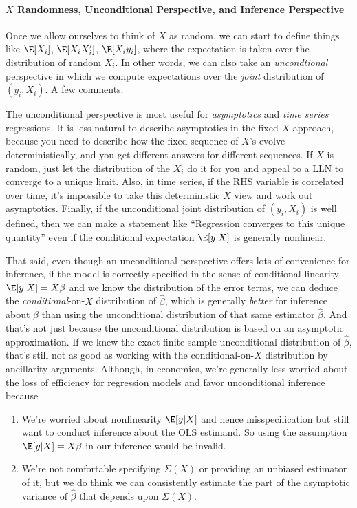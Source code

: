 \documentclass[12pt]{article}
\theoremstyle{plain}
\theoremstyle{definition}
\theoremstyle{remark}
\begin{document}
\paragraph{$X$ Randomness, Unconditional Perspective, and Inference Perspective}
Once we allow ourselves to think of $X$ as random, we can start to
define things like $\E[X_i]$, $\E[X_iX_i']$, $\E[X_iy_i]$, where the
expectation is taken over the distribution of random $X_i$.
In other words, we can also take an \emph{uncondtional} perspective
in which we compute expectations over the \emph{joint} distribution
of $(y_i,X_i)$.
A few comments.

The unconditional perspective is most useful for \emph{asymptotics}
and \emph{time series} regressions.
It is less natural to describe asymptotics in the fixed $X$ approach,
because you need to describe how the fixed sequence of $X$'s evolve
deterministically, and you get different answers for different
sequences.
If $X$ is random, just let the distribution of the $X_i$ do it for
you and appeal to a LLN to converge to a unique limit.
Also, in time series, if the RHS variable is correlated over time,
it's impossible to take this deterministic $X$ view and work out
asymptotics.
Finally, if the unconditional joint distribution of $(y_i,X_i)$ is
well defined, then we can make a statement like ``Regression
converges to this unique quantity'' even if the conditional
expectation $\E[y|X]$ is generally nonlinear.

That said, even though an unconditional perspective offers lots of
convenience for inference,
if the model is correctly specified in the sense of conditional
linearity $\E[y|X]=X\beta$ and we know the distribution of the error
terms,
we can deduce the \emph{conditional}-on-$X$ distribution of
$\widehat{\beta}$, which is generally \emph{better} for inference about
$\beta$ than using the unconditional distribution of that same estimator
$\widehat{\beta}$.
And that's not just because the unconditional distribution is based
on an asymptotic approximation.
If we knew the exact finite sample unconditional distribution of
$\hat{\beta}$, that's still not as good as working with the
conditional-on-$X$ distribution by ancillarity arguments.
Although, in economics, we're generally less worried about
the loss of efficiency for regression models and favor unconditional
inference because
\begin{enumerate}
  \item We're worried about nonlinearity $\E[y|X]$ and hence
    misspecification but still want to conduct inference about the OLS
    estimand.
    So using the assumption $\E[y|X]=X\beta$ in our inference would be
    invalid.
  \item We're not comfortable specifying $\Sigma(X)$ or providing an
    unbiased estimator of it, but we do think we can consistently
    estimate the part of the asymptotic variance of $\widehat{\beta}$
    that depends upon $\Sigma(X)$.
\end{enumerate}
\end{document}

